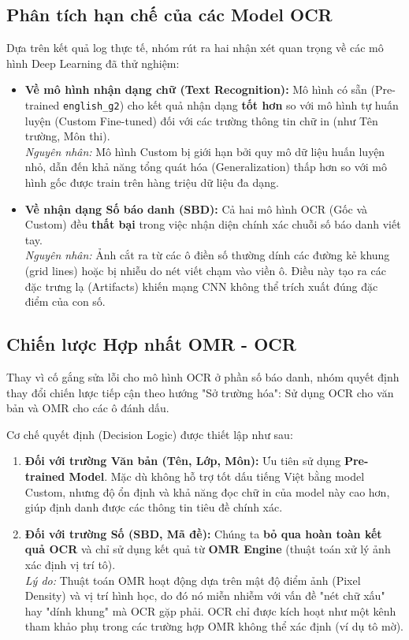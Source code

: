 \documentclass[6pt, a4paper]{report}
\begin{document}
	\subsection{Phân tích hạn chế của các Model OCR}
	Dựa trên kết quả log thực tế, nhóm rút ra hai nhận xét quan trọng về các mô hình Deep Learning đã thử nghiệm:
	
	\begin{itemize}
		\item \textbf{Về mô hình nhận dạng chữ (Text Recognition):} 
		Mô hình có sẵn (Pre-trained \texttt{english\_g2}) cho kết quả nhận dạng \textbf{tốt hơn} so với mô hình tự huấn luyện (Custom Fine-tuned) đối với các trường thông tin chữ in (như Tên trường, Môn thi). 
		\\ \textit{Nguyên nhân:} Mô hình Custom bị giới hạn bởi quy mô dữ liệu huấn luyện nhỏ, dẫn đến khả năng tổng quát hóa (Generalization) thấp hơn so với mô hình gốc được train trên hàng triệu dữ liệu đa dạng.
		
		\item \textbf{Về nhận dạng Số báo danh (SBD):} 
		Cả hai mô hình OCR (Gốc và Custom) đều \textbf{thất bại} trong việc nhận diện chính xác chuỗi số báo danh viết tay.
		\\ \textit{Nguyên nhân:} Ảnh cắt ra từ các ô điền số thường dính các đường kẻ khung (grid lines) hoặc bị nhiễu do nét viết chạm vào viền ô. Điều này tạo ra các đặc trưng lạ (Artifacts) khiến mạng CNN không thể trích xuất đúng đặc điểm của con số.
	\end{itemize}
	
	\subsection{Chiến lược Hợp nhất OMR - OCR}
	Thay vì cố gắng sửa lỗi cho mô hình OCR ở phần số báo danh, nhóm quyết định thay đổi chiến lược tiếp cận theo hướng "Sở trường hóa": Sử dụng OCR cho văn bản và OMR cho các ô đánh dấu.
	
	Cơ chế quyết định (Decision Logic) được thiết lập như sau:
	
	\begin{enumerate}
		\item \textbf{Đối với trường Văn bản (Tên, Lớp, Môn):} 
		Ưu tiên sử dụng \textbf{Pre-trained Model}. Mặc dù không hỗ trợ tốt dấu tiếng Việt bằng model Custom, nhưng độ ổn định và khả năng đọc chữ in của model này cao hơn, giúp định danh được các thông tin tiêu đề chính xác.
		
		\item \textbf{Đối với trường Số (SBD, Mã đề):} 
		Chúng ta \textbf{bỏ qua hoàn toàn kết quả OCR} và chỉ sử dụng kết quả từ \textbf{OMR Engine} (thuật toán xử lý ảnh xác định vị trí tô).
		\\ \textit{Lý do:} Thuật toán OMR hoạt động dựa trên mật độ điểm ảnh (Pixel Density) và vị trí hình học, do đó nó miễn nhiễm với vấn đề "nét chữ xấu" hay "dính khung" mà OCR gặp phải. OCR chỉ được kích hoạt như một kênh tham khảo phụ trong các trường hợp OMR không thể xác định (ví dụ tô mờ).
	\end{enumerate}
	
\end{document}
